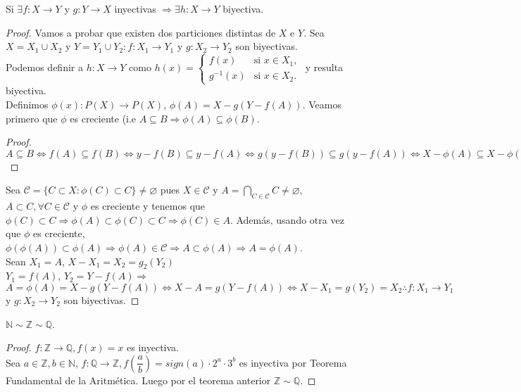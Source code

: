 \begin{theorem}
    Si $\exists f: X \to Y$ y $g: Y \to X$ inyectivas $\Rightarrow \exists h:X \to Y$ biyectiva.

    \begin{proof}
        Vamos a probar que existen dos particiones distintas de $X$ e $Y$. Sea $X = X_1 \cup X_2$ y $Y = Y_1 \cup Y_2 : f: X_1 \to Y_1$ y $g: X_2 \to Y_2$ son biyectivas. \\ 
        
        Podemos definir a $h: X \to Y$ como $h(x) = \begin{cases}
            f(x) & \text{si } x \in X_1, \\
            g^{-1}(x) & \text{si } x \in X_2.
        \end{cases}$ y resulta biyectiva. \\
        
        Definimos $\phi(x):P(X) \to P(X)$, $\phi(A) = X-g(Y-f(A))$. Veamos primero que $\phi$ es creciente (i.e $A \subseteq B \Rightarrow \phi(A) \subseteq \phi(B)$.
        \begin{proof}
             $A \subseteq B \iff f(A) \subseteq f(B) \iff y - f(B) \subseteq y - f(A) \iff g(y-f(B)) \subseteq g(y-f(A)) \iff X - \phi(A) \subseteq X - \phi(B)$
        \end{proof}
        Sea $\mathscr{C} = \{ C \subset X: \phi(C) \subset C \} \neq \varnothing$ pues $X \in \mathscr{C}$ y $A = \bigcap_{C \in \mathscr{C}} C \neq \varnothing$, $A \subset C, \forall C \in \mathscr{C}$ y $\phi$ es creciente y tenemos que $\phi(C) \subset C \Rightarrow \phi(A) \subset \phi(C) \subset C \Rightarrow \phi(C) \in A$. Además, usando otra vez que $\phi$ es creciente, $\phi(\phi(A)) \subset \phi(A) \Rightarrow \phi(A) \in \mathscr{C} \Rightarrow A \subset \phi(A) \Rightarrow A = \phi(A)$. \\

        Sean $X_1 = A$, $X-X_1=X_2=g_2(Y_2)$ \\
        $Y_1 = f(A)$, $Y_2 = Y - f(A) \Rightarrow$ \\
        $A = \phi(A) = X-g(Y-f(A)) \iff X-A = g(Y-f(A)) \iff X-X_1=g(Y_2) = X_2 \therefore f:X_1 \to Y_1$ y $g: X_2 \to Y_2$ son biyectivas.
    \end{proof}
\end{theorem}

\begin{eg}
    $\mathbb{N} \sim \mathbb{Z} \sim \mathbb{Q}$.
    \begin{proof}
        $f:\mathbb{Z} \to \mathbb{Q}, f(x) = x$ es inyectiva. \\
        Sea $a \in \mathbb{Z}, b \in \mathbb{N}$, $f: \mathbb{Q} \to \mathbb{Z}, f(\dfrac{a}{b})=sign(a) \cdot 2^a \cdot 3^b$ es inyectiva por Teorema Fundamental de la Aritmética. Luego por el teorema anterior $\mathbb{Z} \sim \mathbb{Q}$.
    \end{proof}
\end{eg}

